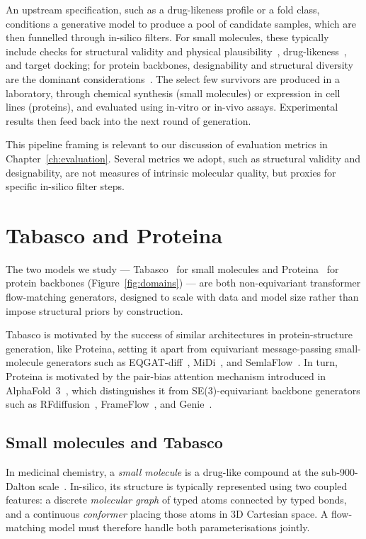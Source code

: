 \documentclass[12pt,a4paper,twoside]{report}
\begin{document}
An upstream specification, such as a drug-likeness profile or a fold class, conditions a generative model to produce a pool of candidate samples, which are then funnelled through in-silico filters. For small molecules, these typically include checks for structural validity and physical plausibility~\cite{PoseBusters}, drug-likeness~\cite{QED}, and target docking; for protein backbones, designability and structural diversity are the dominant considerations~\cite{Proteina}. The select few survivors are produced in a laboratory, through chemical synthesis (small molecules) or expression in cell lines (proteins), and evaluated using in-vitro or in-vivo assays. Experimental results then feed back into the next round of generation.

This pipeline framing is relevant to our discussion of evaluation metrics in Chapter~\ref{ch:evaluation}. Several metrics we adopt, such as structural validity and designability, are not measures of intrinsic molecular quality, but proxies for specific in-silico filter steps.

\section{Tabasco and Proteina}
\label{sec:molecular-domains}

The two models we study --- Tabasco~\cite{Tabasco} for small molecules and Proteina~\cite{Proteina} for protein backbones (Figure~\ref{fig:domains}) --- are both non-equivariant transformer flow-matching generators, designed to scale with data and model size rather than impose structural priors by construction.



Tabasco is motivated by the success of similar architectures in protein-structure generation, like Proteina, setting it apart from equivariant message-passing small-molecule generators such as EQGAT-diff~\cite{EQGATdiff}, MiDi~\cite{MiDi}, and SemlaFlow~\cite{SemlaFlow}. In turn, Proteina is motivated by the pair-bias attention mechanism introduced in AlphaFold~3~\cite{AlphaFold3}, which distinguishes it from SE(3)-equivariant backbone generators such as RFdiffusion~\cite{RFdiffusion}, FrameFlow~\cite{FrameFlow}, and Genie~\cite{Genie}.
\subsection{Small molecules and Tabasco}
\label{sec:small-mol}

In medicinal chemistry, a \emph{small molecule} is a drug-like compound at the sub-900-Dalton scale~\cite{NIHSmallMolGuide}. In-silico, its structure is typically represented using two coupled features: a discrete \emph{molecular graph} of typed atoms connected by typed bonds, and a continuous \emph{conformer} placing those atoms in 3D Cartesian space. A flow-matching model must therefore handle both parameterisations jointly.
\end{document}
